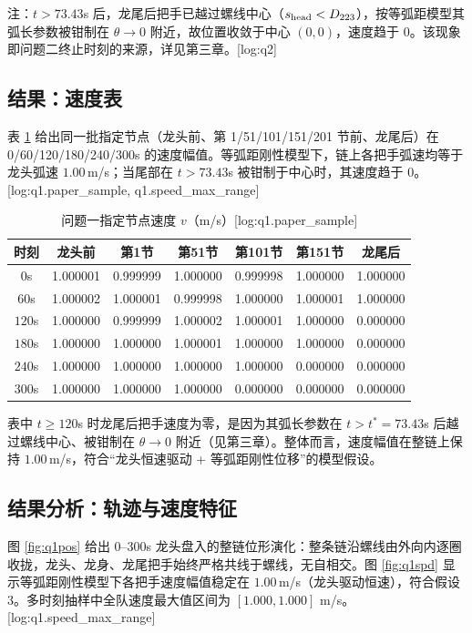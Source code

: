 注：$t>73.43$s 后，龙尾后把手已越过螺线中心（$s_{\rm head}<D_{223}$），按等弧距模型其弧长参数被钳制在 $\theta\to0$ 附近，故位置收敛于中心 $(0,0)$，速度趋于 0。该现象即问题二终止时刻的来源，详见第三章。[log:q2]

\subsection{结果：速度表}
表 \ref{tab:q1spd} 给出同一批指定节点（龙头前、第 1/51/101/151/201 节前、龙尾后）在 0/60/120/180/240/300s 的速度幅值。等弧距刚性模型下，链上各把手弧速均等于龙头弧速 $1.00$\,m/s；当尾部在 $t>73.43$s 被钳制于中心时，其速度趋于 0。[log:q1.paper\_sample, q1.speed\_max\_range]

\begin{table}[H]\centering\small
\caption{问题一指定节点速度 $v$（m/s）[log:q1.paper\_sample]}
\label{tab:q1spd}
\begin{tabular}{ccccccc}
\toprule
时刻 & 龙头前 & 第1节 & 第51节 & 第101节 & 第151节 & 龙尾后 \\
\midrule
$0$s    & 1.000001 & 0.999999 & 1.000000 & 0.999998 & 1.000000 & 1.000000 \\
$60$s   & 1.000002 & 1.000001 & 0.999998 & 1.000000 & 1.000001 & 1.000000 \\
$120$s  & 1.000000 & 0.999999 & 1.000002 & 1.000001 & 1.000000 & 0.000000 \\
$180$s  & 1.000000 & 1.000000 & 1.000001 & 1.000000 & 1.000000 & 0.000000 \\
$240$s  & 1.000000 & 1.000000 & 1.000000 & 1.000000 & 0.000000 & 0.000000 \\
$300$s  & 1.000000 & 1.000000 & 1.000000 & 0.000000 & 0.000000 & 0.000000 \\
\bottomrule
\end{tabular}
\end{table}

\noindent 表中 $t\ge120$s 时龙尾后把手速度为零，是因为其弧长参数在 $t>t^{\ast}=73.43$s 后越过螺线中心、被钳制在 $\theta\to0$ 附近（见第三章）。整体而言，速度幅值在整链上保持 $1.00$\,m/s，符合“龙头恒速驱动 + 等弧距刚性位移”的模型假设。

\subsection{结果分析：轨迹与速度特征}
图 \ref{fig:q1pos} 给出 0--300s 龙头盘入的整链位形演化：整条链沿螺线由外向内逐圈收拢，龙头、龙身、龙尾把手始终严格共线于螺线，无自相交。图 \ref{fig:q1spd} 显示等弧距刚性模型下各把手速度幅值稳定在 $1.00$\,m/s（龙头驱动恒速），符合假设 3。多时刻抽样中全队速度最大值区间为 $[1.000,1.000]$ m/s。[log:q1.speed\_max\_range]

